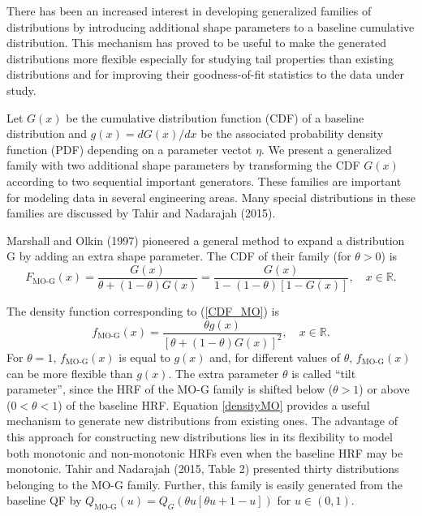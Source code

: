 \documentclass[12pt,a4paper]{article} %
\begin{document}
There has been an increased interest in developing generalized families of distributions by
introducing additional shape parameters to a baseline cumulative distribution. This mechanism has
proved to be useful to make the generated distributions more flexible especially for studying tail properties
than existing distributions and for improving their goodness-of-fit statistics
to the data under study.

Let $G(x)$ be the cumulative distribution function (CDF) of a
baseline distribution and $g(x)=dG(x)/dx$ be the associated
probability density function (PDF) depending on a parameter vectot $\eta$. We present a generalized family
with two additional shape parameters by transforming the CDF $G(x)$
according to two sequential important gene\-rators. These families are important for modeling data
in several engineering areas. Many special distributions in these families are discussed by Tahir
and Nadarajah (2015).


Marshall and Olkin (1997) pioneered a general method to expand
a distribution G by adding an extra shape parameter.
The CDF of their family (for $\theta>0$) is
\begin{equation}\label{CDF_MO}
F_{\text{MO-G}}(x)=\frac{G(x)}{\theta+(1-\theta)G(x)}=\frac{G(x)}{1-(1-\theta)[1-G(x)]},\quad x \in \mathbb{R}.
\end{equation}

The density function corresponding to (\ref{CDF_MO}) is
\begin{equation}\label{densityMO}
f_{\text{MO-G}}(x)=\frac{\theta g(x)}{[\theta+(1-\theta)G(x)]^{2}},\quad x \in \mathbb{R}.
\end{equation}
For $\theta = 1$, $f_{\text{MO-G}}(x)$ is equal to $g(x)$ and, for different values of
$\theta$, $f_{\text{MO-G}}(x)$ can be more flexible than $g(x)$.
The extra parameter $\theta$ is called ``tilt parameter'', since
the HRF of the MO-G family is shifted below ($\theta> 1$)
or above ($0<\theta<1$) of the baseline HRF. Equation \eqref{densityMO} provides a useful
mechanism to generate new distributions from existing ones. The advantage of this approach
for constructing new distributions lies in its flexibility to model
both monotonic and non-monotonic HRFs even when the baseline HRF may be
monotonic. Tahir and Nadarajah (2015, Table 2) presented thirty distributions belonging to
the $\text{MO-G}$ family. Further, this family is easily generated from the baseline QF by
$Q_{\text{MO-G}}(u)=Q_{G}\left(\theta u \left[\theta u+1-u\right]\right)$ for $u\in(0,1)$.
\end{document}
